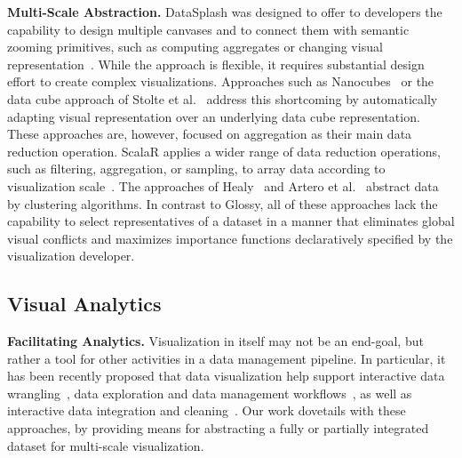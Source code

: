 \documentclass[11pt, oneside]{report}
\newcommand{\minisec}[1]{\noindent\textbf{#1.}}
\begin{document}
{\minisec{Multi-Scale Abstraction}
DataSplash was designed to offer to developers the capability to design multiple canvases and to connect them with semantic zooming primitives, such as computing aggregates or changing visual representation~\cite{woodruff2001datasplash}. While the approach is flexible, it requires substantial design effort to create complex visualizations. Approaches such as Nanocubes~\cite{lins2013nanocubes} or the data cube approach of Stolte et al.~\cite{stolte2003multiscale} address this shortcoming by automatically adapting visual representation over an underlying data cube representation. These approaches are, however, focused on aggregation as their main data reduction operation. ScalaR applies a wider range of data reduction operations, such as filtering, aggregation, or sampling, to array data according to visualization scale~\cite{battle2013scalar}. The approaches of Healy~\cite{healey1996multidimensionalviz} and Artero et al.~\cite{artero2004clustersviz} abstract data by clustering algorithms. In contrast to Glossy, all of these approaches lack the capability to select representatives of a dataset in a manner that eliminates global visual conflicts and maximizes importance functions declaratively specified by the visualization developer.     

\subsection{Visual Analytics}
\label{sec:related:analytics}

\minisec{Facilitating Analytics}
Visualization in itself may not be an end-goal, but rather a tool for other activities in a data management pipeline. In particular, it has been recently proposed that data visualization help support interactive data wrangling~\cite{kandel2011wrangler}, data exploration and data management workflows~\cite{bavoil2005vistrails,fekete2012dmvis}, as well as interactive data integration and cleaning~\cite{morton2014visclean}. Our work dovetails with these approaches, by providing means for abstracting a fully or partially integrated dataset for multi-scale visualization.    

}
\end{document}
